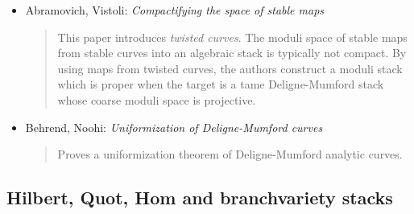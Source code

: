 \begin{itemize}
\item Abramovich, Vistoli: \emph{Compactifying the space of stable maps}
\cite{abramovich-vistoli}
\begin{quote}
This paper introduces \emph{twisted curves}. The moduli space of stable
maps from stable curves into an algebraic stack is typically not compact.
By using maps from twisted curves, the authors construct a moduli stack
which is proper when the target is a tame Deligne-Mumford stack whose
coarse moduli space is projective.
\end{quote}
\item Behrend, Noohi: \emph{Uniformization of Deligne-Mumford curves}
\cite{behrend-noohi}
\begin{quote}
Proves a uniformization theorem of Deligne-Mumford analytic curves.
\end{quote}
\end{itemize}

\subsection{Hilbert, Quot, Hom and branchvariety stacks}
\label{subsection-hilbert-quot-hom}

